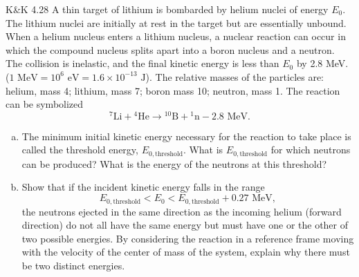 \documentclass{esg8012pset}
\begin{document}
\begin{problem}{K\&K 4.28}
  A thin target of lithium is bombarded by helium nuclei of energy $E_0$. The lithium nuclei are initially at rest in the target but are essentially unbound. When a helium nucleus enters a lithium nucleus, a nuclear reaction can occur in which the compound nucleus splits apart into a boron nucleus and a neutron. The collision is inelastic, and the final kinetic energy is less than $E_0$ by 2.8 MeV. ($1\text{ MeV} = 10^6\text{ eV} = 1.6 \times 10^{-13}\text{ J}$). The relative masses of the particles are: helium, mass 4; lithium, mass 7; boron mass 10; neutron, mass 1. The reaction can be symbolized
  $${}^7\text{Li} + {}^4\text{He} \to {}^{10}\text{B} + {}^1\text{n} - 2.8\text{ MeV}.$$
  \begin{enumerate}[(a)]
  \item The minimum initial kinetic energy necessary for the reaction to take place is called the threshold energy, $E_{0,\text{threshold}}$. What is $E_{0,\text{threshold}}$ for which neutrons can be produced? What is the energy of the neutrons at this threshold?
    \item Show that if the incident kinetic energy falls in the range $$E_{0,\text{threshold}} < E_0 < E_{0,\text{threshold}} + 0.27\text{ MeV},$$ the neutrons ejected in the same direction as the incoming helium (forward direction) do not all have the same energy but must have one or the other of two possible energies. By considering the reaction in a reference frame moving with the velocity of the center of mass of the system, explain why there must be two distinct energies.
  \end{enumerate}
\end{problem}
\end{document}
